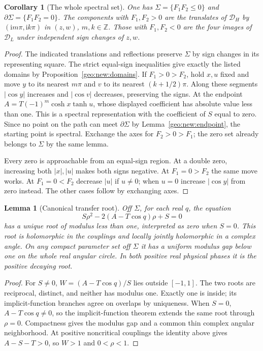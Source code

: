 \documentclass[11pt]{article}
\numberwithin{equation}{section}
\newtheorem{lemma}[theorem]{Lemma}
\newtheorem{corollary}[theorem]{Corollary}
\theoremstyle{definition}
\newcommand{\Z}{\mathbb Z}
\newcommand{\ii}{\mathrm i}
\begin{document}
\begin{corollary}[The whole spectral set]\label{geo:whole}
One has $\Sigma=\{F_1F_2\le0\}$ and $\partial\Sigma=\{F_1F_2=0\}$.
The components with $F_1,F_2>0$
are the translates of $\mathcal D_H$ by $(\ii m\pi,\ii k\pi)$ in
$(z,w)$, $m,k\in\Z$. Those with $F_1,F_2<0$ are the four images of
$\mathcal D_L$ under independent sign changes of $z,w$.
\end{corollary}
\begin{proof}
The indicated translations and reflections preserve $\Sigma$ by
sign changes in its representing square. The strict equal-sign
inequalities give exactly the listed domains by
Proposition~\ref{geo:new:domains}. If $F_1>0>F_2$, hold $x,u$
fixed and move $y$ to its nearest $m\pi$ and $v$ to its nearest
$(k+1/2)\pi$. Along these segments $|\cos y|$ increases and
$|\cos v|$ decreases, preserving the signs. At the endpoint
$A=T(-1)^m\cosh x\tanh u$, whose displayed coefficient has
absolute value less than one. This is a spectral representation
with the coefficient of $S$ equal to zero. Since no point on the
path can meet $\partial\Sigma$ by Lemma~\ref{geo:new:endpoint},
the starting point is spectral. Exchange the axes for $F_2>0>F_1$;
the zero set already belongs to $\Sigma$ by the same lemma.

Every zero is approachable from an equal-sign region. At a double
zero, increasing both $|x|,|u|$ makes both signs negative. At
$F_1=0>F_2$ the same move works. At $F_1=0<F_2$ decrease $|u|$
if $u\ne0$; when $u=0$ increase $|\cos y|$ from zero instead.
The other cases follow by exchanging axes.
\end{proof}

\begin{lemma}[Canonical transfer root]
\label{geo:new:root}
Off $\Sigma$, for each real $q$, the equation
\[
 S\rho^2-2(A-T\cos q)\rho+S=0
\]
has a unique root of modulus less than one, interpreted as zero
when $S=0$.  This root is holomorphic in the couplings and locally
jointly holomorphic in a complex angle.  On any compact parameter
set off $\Sigma$ it has a uniform modulus gap below one on the
whole real angular circle.  In both positive real physical phases
it is the positive decaying root.
\end{lemma}
\begin{proof}
For $S\ne0$, $W=(A-T\cos q)/S$ lies outside $[-1,1]$.
The two roots are reciprocal, distinct, and neither has modulus
one.  Exactly one is inside; its implicit-function branches agree
on overlaps by uniqueness.  When $S=0$, $A-T\cos q\ne0$,
so the implicit-function theorem extends the same root through
$\rho=0$.  Compactness gives the modulus gap and a common thin
complex angular neighborhood.  At positive noncritical couplings
the identity above gives $A-S-T>0$, so $W>1$ and $0<\rho<1$.
\end{proof}
\end{document}
